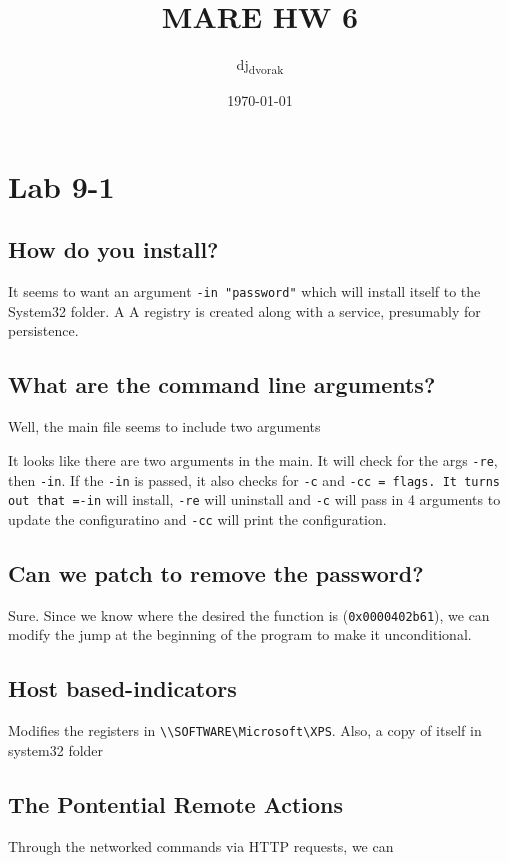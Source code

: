 \documentclass[11pt]{article}
\author{dj\textsubscript{dvorak}}
\date{\today}
\title{MARE HW 6}
\begin{document}
\maketitle
\tableofcontents


\section{Lab 9-1}
\label{sec:org259ed1f}

\subsection{How do you install?}
\label{sec:org587a113}
It seems to want an argument \texttt{-in "password"} which will install itself to the System32 folder. A
A registry is created along with a service, presumably for persistence.

\subsection{What are the command line arguments?}
\label{sec:org07d934c}
Well, the main file seems to include two arguments 

It looks like there are two arguments in the main. It will check for the args
\texttt{-re}, then \texttt{-in}. If the \texttt{-in} is passed, it also checks for \texttt{-c} and \texttt{-cc = flags.
It turns out that =-in} will install, \texttt{-re} will uninstall and \texttt{-c} will pass in 4 arguments
to update the configuratino and \texttt{-cc} will print the configuration. 

\subsection{Can we patch to remove the password?}
\label{sec:orgbff4e0c}

Sure. Since we know where the desired the function is (\texttt{0x0000402b61}), we can modify the jump at 
the beginning of the program to make it unconditional.

\subsection{Host based-indicators}
\label{sec:orgbe03220}
Modifies the registers in \texttt{\textbackslash{}\textbackslash{}SOFTWARE\textbackslash{}Microsoft\textbackslash{}XPS}. 
Also, a copy of itself in system32 folder
\subsection{The Pontential Remote Actions}
\label{sec:org87fe65a}
Through the networked commands via HTTP requests, we can 
\end{document}

